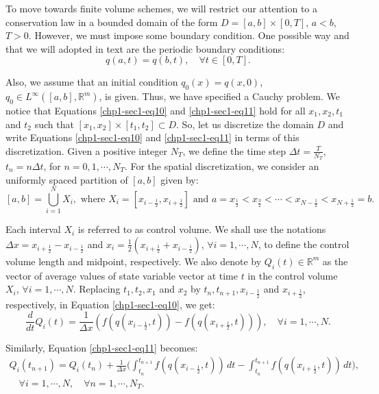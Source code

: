 To move towards finite volume schemes, we will restrict our attention
to a conservation law in a bounded domain of the form 
$D = [a,b]\times[0,T]$, $a<b$, $T>0$. However, we must 
impose some boundary condition. One possible way and that we will adopted 
in text are the periodic boundary conditions:
\begin{equation}
        \label{chp1-sec1-eq12}
	{q}(a, t) = {q}(b, t),\quad \forall t \in [0, T].
\end{equation}

Also, we assume that an initial condition $q_0(x) = q(x,0)$, $q_0 \in L^{\infty}([a,b],\mathbb{R}^m)$, is given.
Thus, we have specified a Cauchy problem.
We notice that Equations \eqref{chp1-sec1-eq10} and \eqref{chp1-sec1-eq11}
hold for all $x_1, x_2, t_1$ and $t_2$ such that
$[x_1, x_2] \times [t_1, t_2] \subset D$.
So, let us discretize the domain $D$ and write 
Equations \eqref{chp1-sec1-eq10} and \eqref{chp1-sec1-eq11} in terms of this discretization.
Given a positive integer $N_T$, we define the time step 
$\Delta t = \frac{T}{N_T}$, $t_n = n \Delta t$, for $n = 0, 1 ,\cdots, N_T$.
For the spatial discretization, we consider an uniformly spaced partition of $[a, b]$ given by: 
\begin{equation}
	\label{chp1-sec1-eq13}
	[a,b] = \bigcup_{i=1}^N X_i, 
	\text{ where } X_i= [x_{i-\frac{1}{2}}, x_{i+\frac{1}{2}}] \text{ and } 
	a = x_{\frac{1}{2}} < x_{\frac{3}{2}} < \cdots < x_{N-\frac{1}{2}} < x_{N+\frac{1}{2}} = b.
\end{equation}

Each interval $X_i$ is referred to as control volume. 
We shall use the notations $\Delta x = x_{i+\frac{1}{2}} - x_{i-\frac{1}{2}}$ 
and $x_i = \frac{1}{2}(x_{i+\frac{1}{2}} + x_{i-\frac{1}{2}})$, $\forall i = 1, \cdots, N$, 
to define the control volume length and midpoint, respectively.
We also denote by ${Q}_i(t) \in \mathbb{R}^m$ as the vector of 
average values of state variable vector at time $t$
in the control volume $X_i$, $\forall i = 1, \cdots, N$. Replacing $t_1, t_2, x_1$ and 
$x_2$ by $t_{n}, t_{n+1}, x_{i-\frac{1}{2}}$ and $x_{i+\frac{1}{2}}$,
respectively, in Equation \eqref{chp1-sec1-eq10}, we get:
\begin{equation}
        \label{chp1-sec1-eq14}
	\frac{d}{dt} {Q}_i(t) = \frac{1}{\Delta x}
	({f}({q}(x_{i-\frac{1}{2}},t)) -
	{f}({q}(x_{i+\frac{1}{2}},t))) ,
	\quad \forall i = 1, \cdots, N.
\end{equation}

Similarly, Equation \eqref{chp1-sec1-eq11} becomes:
\begin{equation}
        \label{chp1-sec1-eq15}
	\begin{aligned}
		{Q}_i(t_{n+1}) =  {Q}_i(t_n) +
		\frac{1}{\Delta x}\bigg( \int_{t_n}^{t_{n+1}}
        	{f}({q}(x_{i-\frac{1}{2}}, t)) \,dt -
		\int_{t_n}^{t_{n+1}}{f}({q}(x_{i+\frac{1}{2}}, t)) \,dt \bigg),
       		\\
		\quad \forall i = 1, \cdots, N,
		\quad \forall n = 1, \cdots, N_T.
	\end{aligned}
\end{equation}

